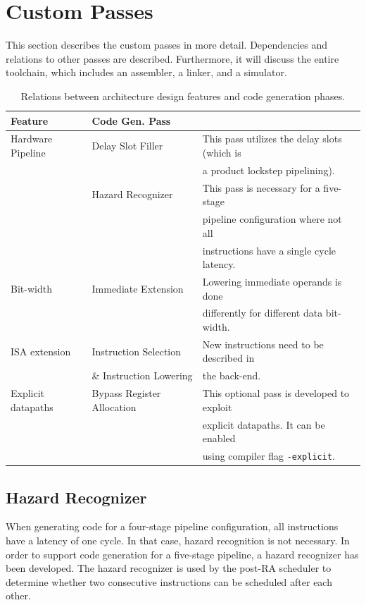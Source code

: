 \section{Custom Passes}
This section describes the custom passes in more detail. Dependencies and relations to other passes are described. Furthermore, it will discuss the entire toolchain, which includes an assembler, a linker, and a simulator. 

\begin{table}[t!]
\caption{Relations between architecture design features and code generation phases.}
\begin{center}
\begin{tabular}{@{}l l l@{}}
\toprule
\textbf{Feature} & \textbf{Code Gen. Pass} \\ \hline
Hardware Pipeline 	& Delay Slot Filler 		& This pass utilizes the delay slots (which is\\
				&					& a product lockstep pipelining).\\
			 	& Hazard Recognizer 	& This pass is necessary for a five-stage \\
				&					& pipeline configuration where not all\\
				&					& instructions have a single cycle latency.\\
Bit-width 			& Immediate Extension 	& Lowering immediate operands is done\\
				&				    	& differently for different data bit-width. \\
ISA extension		& Instruction Selection 	& New instructions need to be described in\\
				& \& Instruction Lowering	& the back-end. \\
Explicit datapaths 	& Bypass Register Allocation & This optional pass is developed to exploit\\
				&					& explicit datapaths. It can be enabled\\
				&					& using compiler flag \texttt{-explicit}. \\
\bottomrule
\end{tabular}
\end{center}
\label{table:rel_feature_pass}
\end{table}%

\subsection{Hazard Recognizer}\label{sec:hazard_recogn}
When generating code for a four-stage pipeline configuration, all instructions have a latency of one cycle. In that case, hazard recognition is not necessary.
In order to support code generation for a five-stage pipeline, a hazard recognizer has been developed. The hazard recognizer is used by the post-RA scheduler to determine whether two consecutive instructions can be scheduled after each other. 

